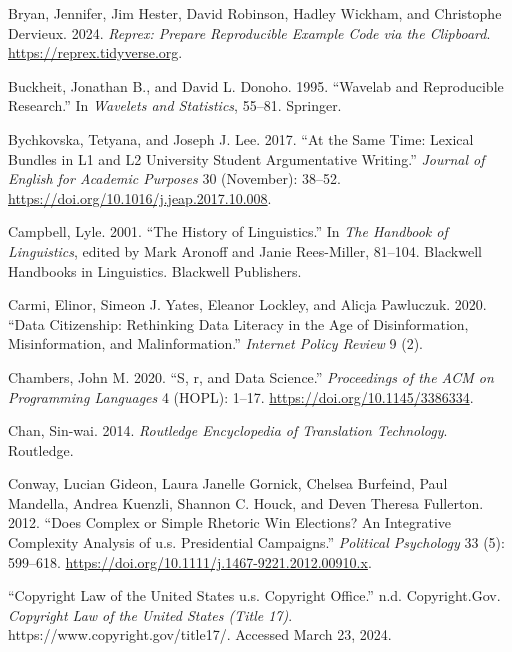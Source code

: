 \documentclass[
  letterpaper,
]{latex/krantz}
\newlength{\cslhangindent}
\newenvironment{CSLReferences}[2] %
 {\begin{list}{}{%
  \setlength{\itemindent}{0pt}
  \setlength{\leftmargin}{0pt}
  \setlength{\parsep}{0pt}
  \ifodd #1
   \setlength{\leftmargin}{\cslhangindent}
   \setlength{\itemindent}{-1\cslhangindent}
  \fi
  \setlength{\itemsep}{#2\baselineskip}}}
 {\end{list}}
\theoremstyle{definition}
\theoremstyle{remark}
\begin{document}
\begin{CSLReferences}{1}{0}
Bryan, Jennifer, Jim Hester, David Robinson, Hadley Wickham, and
Christophe Dervieux. 2024. \emph{Reprex: Prepare Reproducible Example
Code via the Clipboard}. \url{https://reprex.tidyverse.org}.

Buckheit, Jonathan B., and David L. Donoho. 1995. {``Wavelab and
Reproducible Research.''} In \emph{Wavelets and Statistics}, 55--81.
Springer.

Bychkovska, Tetyana, and Joseph J. Lee. 2017. {``At the Same Time:
Lexical Bundles in L1 and L2 University Student Argumentative
Writing.''} \emph{Journal of English for Academic Purposes} 30
(November): 38--52. \url{https://doi.org/10.1016/j.jeap.2017.10.008}.

Campbell, Lyle. 2001. {``The History of Linguistics.''} In \emph{The
Handbook of Linguistics}, edited by Mark Aronoff and Janie Rees-Miller,
81--104. Blackwell Handbooks in Linguistics. Blackwell Publishers.

Carmi, Elinor, Simeon J. Yates, Eleanor Lockley, and Alicja Pawluczuk.
2020. {``Data Citizenship: Rethinking Data Literacy in the Age of
Disinformation, Misinformation, and Malinformation.''} \emph{Internet
Policy Review} 9 (2).

Chambers, John M. 2020. {``S, r, and Data Science.''} \emph{Proceedings
of the ACM on Programming Languages} 4 (HOPL): 1--17.
\url{https://doi.org/10.1145/3386334}.

Chan, Sin-wai. 2014. \emph{Routledge Encyclopedia of Translation
Technology}. Routledge.

Conway, Lucian Gideon, Laura Janelle Gornick, Chelsea Burfeind, Paul
Mandella, Andrea Kuenzli, Shannon C. Houck, and Deven Theresa Fullerton.
2012. {``Does Complex or Simple Rhetoric Win Elections? An Integrative
Complexity Analysis of u.s. Presidential Campaigns.''} \emph{Political
Psychology} 33 (5): 599--618.
\url{https://doi.org/10.1111/j.1467-9221.2012.00910.x}.

{``Copyright Law of the United States {\textbar} u.s. Copyright
Office.''} n.d. Copyright.Gov. \emph{Copyright Law of the United States
(Title 17)}. https://www.copyright.gov/title17/. Accessed March 23,
2024.


\end{CSLReferences}
\end{document}
